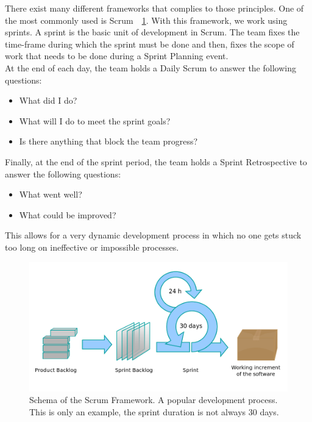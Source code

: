 \documentclass[12pt]{article}
\theoremstyle{definition}
\theoremstyle{definition}
\theoremstyle{remark}
\begin{document}
There exist many different frameworks that complies to those principles. One of the most commonly used is Scrum~\cite{ScrumAlliance:2017}~\ref{Scrum}. With this framework, we work using sprints. A sprint is the basic unit of development in Scrum. The team fixes the time-frame during which the sprint must be done and then, fixes the scope of work that needs to be done during a Sprint Planning event.\\

At the end of each day, the team holds a Daily Scrum to answer the following questions:

\begin{itemize}
\item What did I do?
\item What will I do to meet the sprint goals?
\item Is there anything that block the team progress?
\end{itemize}

Finally, at the end of the sprint period, the team holds a Sprint Retrospective to answer the following questions:

\begin{itemize}
\item What went well?
\item What could be improved?
\end{itemize}

This allows for a very dynamic development process in which no one gets stuck too long on ineffective or impossible processes.

\begin{figure}
    \centering
    \includegraphics[scale=0.4]{scrum.png}
    \caption{Schema of the Scrum Framework. A popular development process. This is only an example, the sprint duration is not always 30 days.}
    \label{Scrum}
\end{figure}
\end{document}
